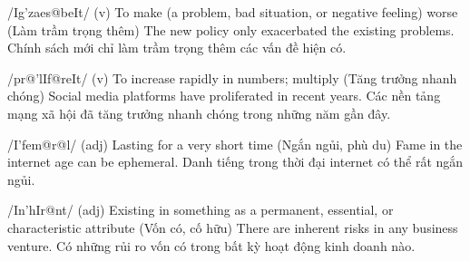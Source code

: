 {/Ig'zaes@beIt/ (v)}
{To make (a problem, bad situation, or negative feeling) worse (Làm trầm trọng thêm)}
{The new policy only exacerbated the existing problems.}
{Chính sách mới chỉ làm trầm trọng thêm các vấn đề hiện có.}

{/pr@'lIf@reIt/ (v)}
{To increase rapidly in numbers; multiply (Tăng trưởng nhanh chóng)}
{Social media platforms have proliferated in recent years.}
{Các nền tảng mạng xã hội đã tăng trưởng nhanh chóng trong những năm gần đây.}

{/I'fem@r@l/ (adj)}
{Lasting for a very short time (Ngắn ngủi, phù du)}
{Fame in the internet age can be ephemeral.}
{Danh tiếng trong thời đại internet có thể rất ngắn ngủi.}

{/In'hIr@nt/ (adj)}
{Existing in something as a permanent, essential, or characteristic attribute (Vốn có, cố hữu)}
{There are inherent risks in any business venture.}
{Có những rủi ro vốn có trong bất kỳ hoạt động kinh doanh nào.}
